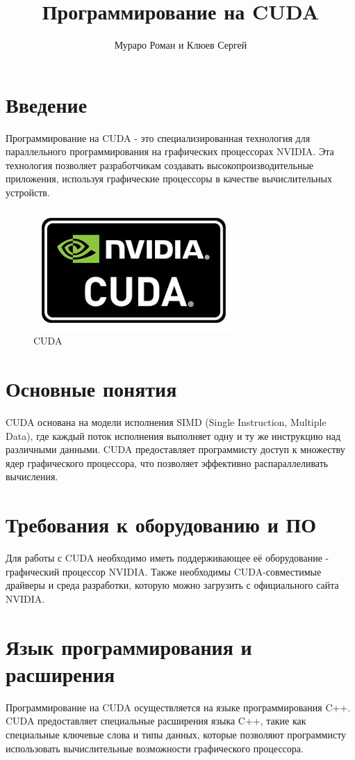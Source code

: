 \documentclass[a4paper, 12pt]{article}
\title{Программирование на CUDA}
\author{Мураро Роман и Клюев Сергей}
\date{}
\begin{document}
\maketitle

\section{Введение}
Программирование на CUDA - это специализированная технология для параллельного программирования на графических процессорах NVIDIA. Эта технология позволяет разработчикам создавать высокопроизводительные приложения, используя графические процессоры в качестве вычислительных устройств.


\begin{figure}[!ht] 
		\centering
		\includegraphics[scale=0.5]{kekw.png} 
		\caption{CUDA}
		\label{fig:first_image}
	\end{figure}

\section{Основные понятия}
CUDA основана на модели исполнения SIMD (Single Instruction, Multiple Data), где каждый поток исполнения выполняет одну и ту же инструкцию над различными данными. CUDA предоставляет программисту доступ к множеству ядер графического процессора, что позволяет эффективно распараллеливать вычисления.

\section{Требования к оборудованию и ПО}
Для работы с CUDA необходимо иметь поддерживающее её оборудование - графический процессор NVIDIA. Также необходимы CUDA-совместимые драйверы и среда разработки, которую можно загрузить с официального сайта NVIDIA.

\section{Язык программирования и расширения}
Программирование на CUDA осуществляется на языке программирования C++. CUDA предоставляет специальные расширения языка C++, такие как специальные ключевые слова и типы данных, которые позволяют программисту использовать вычислительные возможности графического процессора.
\end{document}
